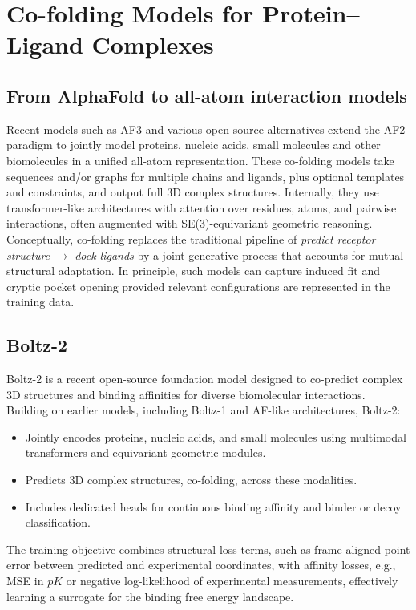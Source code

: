 \documentclass[12pt]{article}
\begin{document}
\section{Co-folding Models for Protein–Ligand Complexes}

\subsection{From AlphaFold to all-atom interaction models}

Recent models such as AF3 and various open-source alternatives extend the AF2 paradigm to jointly model proteins, nucleic acids, small molecules and other biomolecules in a unified all-atom representation.\cite{CH13_abramson2024accurate,CH13_proteinpredictionuntilcasp15,CH13_alphafoldbeyond2025} These co-folding models take sequences and/or graphs for multiple chains and ligands, plus optional templates and constraints, and output full 3D complex structures. Internally, they use transformer-like architectures with attention over residues, atoms, and pairwise interactions, often augmented with SE(3)-equivariant geometric reasoning. Conceptually, co-folding replaces the traditional pipeline of \emph{predict receptor structure} $\to$ \emph{dock ligands} by a joint generative process that accounts for mutual structural adaptation. In principle, such models can capture induced fit and cryptic pocket opening provided relevant configurations are represented in the training data.

\subsection{Boltz-2}

Boltz-2\cite{CH13_passaro2025boltz2} is a recent open-source foundation model designed to co-predict complex 3D structures and binding affinities for diverse biomolecular interactions. Building on earlier models, including Boltz-1 and AF-like architectures, Boltz-2:
\begin{itemize}
  \item Jointly encodes proteins, nucleic acids, and small molecules using multimodal transformers and equivariant geometric modules.
  \item Predicts 3D complex structures, co-folding, across these modalities.
  \item Includes dedicated heads for continuous binding affinity and binder or decoy classification.
\end{itemize}
The training objective combines structural loss terms, such as frame-aligned point error between predicted and experimental coordinates, with affinity losses, e.g., MSE in $pK$ or negative log-likelihood of experimental measurements, effectively learning a surrogate for the binding free energy landscape.
\end{document}
